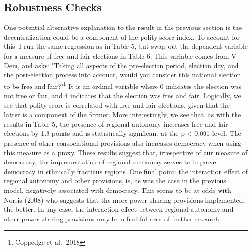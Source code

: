 \documentclass[12pt]{article}
\begin{document}
\subsection{Robustness Checks}

One potential alternative explanation to the result in the previous section is the decentralization could be a component of the polity score index. To account for this, I run the same regression as in Table 5, but swap out the dependent variable for a measure of free and fair elections in Table 6. This variable comes from V-Dem, and asks: "Taking all aspects of the pre-election period, election day, and the post-election process into account, would you consider this national election to be free and fair?"\footnote{Coppedge et al., 2018} It is an ordinal variable where 0 indicates the election was not free or fair, and 4 indicates that the election was free and fair. Logically, we see that polity score is correlated with free and fair elections, given that the latter is a component of the former. More interestingly, we see that, as with the results in Table 5, the presence of regional autonomy increases free and fair elections by 1.8 points and is statistically significant at the p < 0.001 level. The presence of other consociational provisions also increases democracy when using this measure as a proxy. These results suggest that, irrespective of our measure of democracy, the implementation of regional autonomy serves to improve democracy in ethnically fractious regions. One final point: the interaction effect of regional autonomy and other provisions, is, as was the case in the previous model, negatively associated with democracy. This seems to be at odds with Norris (2008) who suggests that the more power-sharing provisions implemented, the better. In any case, the interaction effect between regional autonomy and other power-sharing provisions may be a fruitful area of further research. 
\end{document}
